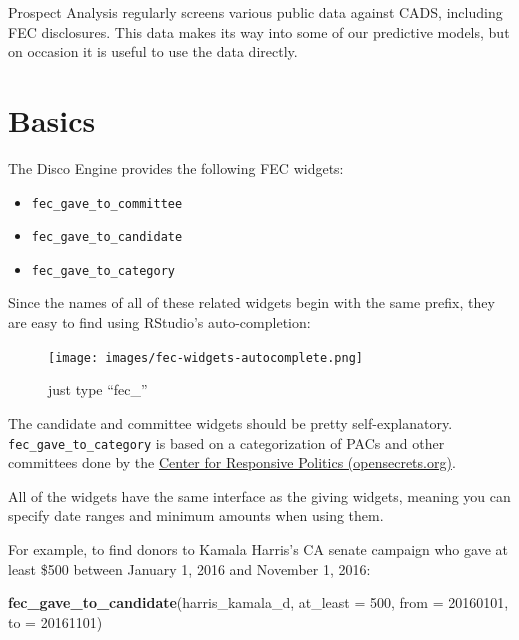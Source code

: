 \documentclass[]{book}
\newenvironment{Shaded}{\begin{snugshade}}{\end{snugshade}}
\newcommand{\DataTypeTok}[1]{\textcolor[rgb]{0.13,0.29,0.53}{#1}}
\newcommand{\DecValTok}[1]{\textcolor[rgb]{0.00,0.00,0.81}{#1}}
\newcommand{\KeywordTok}[1]{\textcolor[rgb]{0.13,0.29,0.53}{\textbf{#1}}}
\newcommand{\NormalTok}[1]{#1}
\providecommand{\tightlist}{%
  \setlength{\itemsep}{0pt}\setlength{\parskip}{0pt}}
\begin{document}
Prospect Analysis regularly screens various public data against CADS, including FEC disclosures. This data makes its way into some of our predictive models, but on occasion it is useful to use the data directly.

\hypertarget{basics}{%
\section{Basics}\label{basics}}

The Disco Engine provides the following FEC widgets:

\begin{itemize}
\tightlist
\item
  \texttt{fec\_gave\_to\_committee}
\item
  \texttt{fec\_gave\_to\_candidate}
\item
  \texttt{fec\_gave\_to\_category}
\end{itemize}

Since the names of all of these related widgets begin with the same prefix, they are easy to find using RStudio's auto-completion:

\begin{figure}
\centering
\texttt{[image: images/fec-widgets-autocomplete.png]}
\caption{just type ``fec\_''}
\end{figure}

The candidate and committee widgets should be pretty self-explanatory. \texttt{fec\_gave\_to\_category} is based on a categorization of PACs and other committees done by the \href{https://www.opensecrets.org/}{Center for Responsive Politics (opensecrets.org)}.

All of the widgets have the same interface as the giving widgets, meaning you can specify date ranges and minimum amounts when using them.

For example, to find donors to Kamala Harris's CA senate campaign who gave at least \$500 between January 1, 2016 and November 1, 2016:

\begin{Shaded}
\begin{Highlighting}[]
\KeywordTok{fec_gave_to_candidate}\NormalTok{(harris_kamala_d, }\DataTypeTok{at_least =} \DecValTok{500}\NormalTok{, }
                      \DataTypeTok{from =} \DecValTok{20160101}\NormalTok{, }\DataTypeTok{to =} \DecValTok{20161101}\NormalTok{)}
\end{Highlighting}
\end{Shaded}
\end{document}
